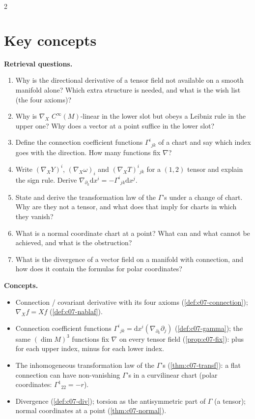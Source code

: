 \begin{paracol}{2}
\section*{Key concepts}
\begin{keyconcepts}
\textbf{Retrieval questions.}
\begin{enumerate}
  \item Why is the directional derivative of a tensor field not available on a smooth manifold alone? Which extra structure is needed, and what is the wish list (the four axioms)?
  \item Why is $\nabla_X$ $C^\infty(M)$-linear in the lower slot but obeys a Leibniz rule in the upper one? Why does a vector at a point suffice in the lower slot?
  \item Define the connection coefficient functions $\Gamma^i{}_{jk}$ of a chart and say which index goes with the direction. How many functions fix $\nabla$?
  \item Write $(\nabla_XY)^i$, $(\nabla_X\omega)_i$ and $(\nabla_XT)^i{}_{jk}$ for a $(1,2)$ tensor and explain the sign rule. Derive $\nabla_{\partial_k}\mathrm dx^i=-\Gamma^i{}_{jk}\mathrm dx^j$.
  \item State and derive the transformation law of the $\Gamma$'s under a change of chart. Why are they not a tensor, and what does that imply for charts in which they vanish?
  \item What is a normal coordinate chart at a point? What can and what cannot be achieved, and what is the obstruction?
  \item What is the divergence of a vector field on a manifold with connection, and how does it contain the formulas for polar coordinates?
\end{enumerate}
\textbf{Concepts.}
\begin{itemize}
  \item Connection / covariant derivative with its four axioms (\cref{def:c07-connection}); $\nabla_Xf=Xf$ (\cref{def:c07-nablaf}).
  \item Connection coefficient functions $\Gamma^i{}_{jk}=\mathrm dx^i(\nabla_{\partial_k}\partial_j)$ (\cref{def:c07-gamma}); the same $(\dim M)^3$ functions fix $\nabla$ on every tensor field (\cref{prop:c07-fix}): plus for each upper index, minus for each lower index.
  \item The inhomogeneous transformation law of the $\Gamma$'s (\cref{thm:c07-transf}): a flat connection can have non-vanishing $\Gamma$'s in a curvilinear chart (polar coordinates: $\Gamma^1{}_{22}=-r$).
  \item Divergence (\cref{def:c07-div}); torsion as the antisymmetric part of $\Gamma$ (a tensor); normal coordinates at a point (\cref{thm:c07-normal}).
\end{itemize}
\end{keyconcepts}

\flushside
\end{paracol}
